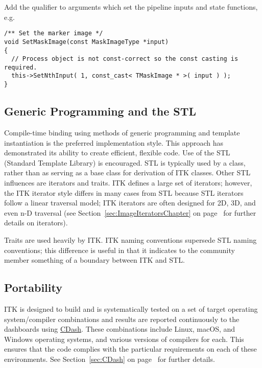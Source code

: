 Add the  qualifier to arguments which set the pipeline inputs and
state functions, e.g.
\small
\begin{verbatim}
/** Set the marker image */
void SetMaskImage(const MaskImageType *input)
{
  // Process object is not const-correct so the const casting is required.
  this->SetNthInput( 1, const_cast< TMaskImage * >( input ) );
}
\end{verbatim}
\normalsize


\subsection{Generic Programming and the STL}
\label{subsec:GenericProgrammingAndSTL}

Compile-time binding using methods of generic programming and template
instantiation is the preferred implementation style. This approach has
demonstrated its ability to create efficient, flexible code. Use of the STL
(Standard Template Library) is encouraged. STL is typically used by a class,
rather than as serving as a base class for derivation of ITK classes. Other
STL influences are iterators and traits. ITK defines a large set of iterators;
however, the ITK iterator style differs in many cases from STL because STL
iterators follow a linear traversal model; ITK iterators are often designed for
2D, 3D, and even n-D traversal (see Section~\ref{sec:ImageIteratorsChapter} on
page~\pageref{sec:ImageIteratorsChapter} for further details on iterators).

Traits are used heavily by ITK. ITK naming conventions supersede STL naming
conventions; this difference is useful in that it indicates to the community
member something of a boundary between ITK and STL.


\subsection{Portability}
\label{subsec:Portability}

ITK is designed to build and is systematically tested on a set of target
operating system/compiler combinations and results are reported continuously
to the dashboards using \href{https://www.cdash.org/}{CDash}. These combinations
include Linux, macOS, and Windows operating systems, and various versions of
compilers for each. This ensures that the code complies with the particular
requirements on each of these environments. See Section~\ref{sec:CDash}
on page~\pageref{sec:CDash} for further details.

